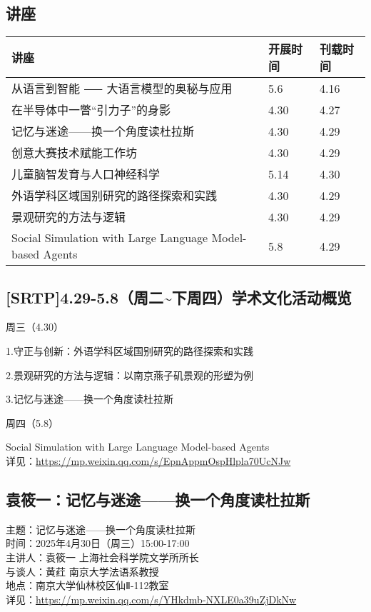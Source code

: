 \documentclass[letterpaper, 12pt]{article}
\begin{document}
\begin{multicols}{2}
\pagebreak

\section{讲座}
\begin{tabular}{|>{\centering\arraybackslash}m{}|m{}|m{}|}
    \hline
    讲座 & 开展时间 & 刊载时间\\
    \hline\hline
    从语言到智能 ⸺ 大语言模型的奥秘与应用 & 5.6 & 4.16\\\hline
    在半导体中一瞥“引力子”的身影 & 4.30 & 4.27\\\hline
    记忆与迷途——换一个角度读杜拉斯 & 4.30 & 4.29\\\hline
    创意大赛技术赋能工作坊 & 4.30 & 4.29\\\hline
    儿童脑智发育与人口神经科学 & 5.14 & 4.30\\\hline
    外语学科区域国别研究的路径探索和实践 & 4.30 & 4.29\\\hline
    景观研究的方法与逻辑 & 4.30 & 4.29\\\hline
    Social Simulation with Large Language Model-based Agents & 5.8 & 4.29\\\hline
\end{tabular}
\subsection{[SRTP]4.29-5.8（周二\textasciitilde{}下周四）学术文化活动概览} %
周三（4.30）

1.守正与创新：外语学科区域国别研究的路径探索和实践

2.景观研究的方法与逻辑：以南京燕子矶景观的形塑为例

3.记忆与迷途——换一个角度读杜拉斯

周四（5.8）

Social Simulation with Large Language Model-based Agents
\\详见：\url{https://mp.weixin.qq.com/s/EpnAppmOspHlpla70UcNJw}

\subsection{袁筱一：记忆与迷途——换一个角度读杜拉斯} %
主题：记忆与迷途——换一个角度读杜拉斯
\\时间：2025年4月30日（周三）15:00-17:00
\\主讲人：袁筱一 上海社会科学院文学所所长
\\与谈人：黄荭 南京大学法语系教授
\\地点：南京大学仙林校区仙Ⅱ-112教室
\\详见：\url{https://mp.weixin.qq.com/s/YHkdmb-NXLE0a39uZjDkNw}


\end{multicols}
\end{document}
